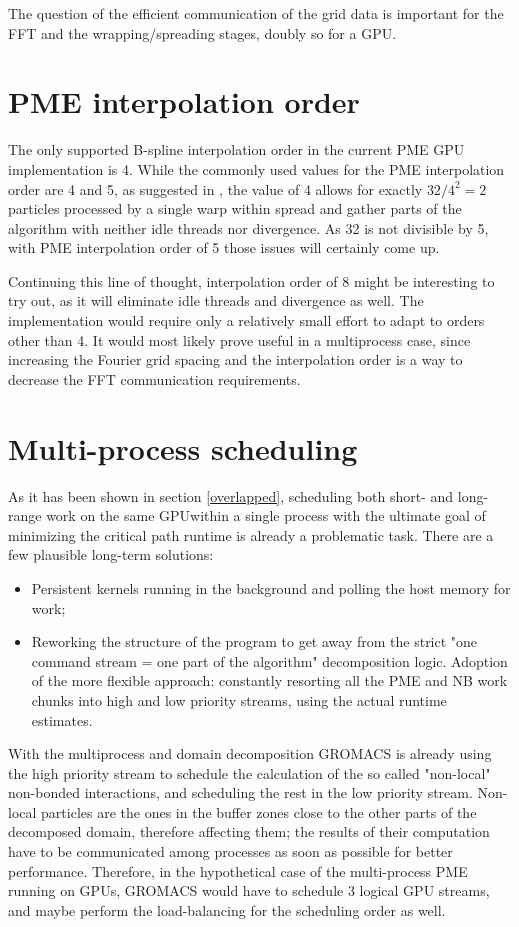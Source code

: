 \documentclass[12pt,a4paper]{report}
\newcommand{\draft}[1]{#1}
\begin{document}
The question of the efficient communication of the grid data is important for the FFT and the wrapping/spreading stages, doubly so for a GPU.
 
\section{PME interpolation order}
The only supported B-spline interpolation order in the current PME GPU implementation is 4. While the commonly used values for the PME interpolation order are 4 and 5, as suggested in \cite{spme}, the value of 4 allows for exactly $32/4^2 = 2$ particles processed by a single warp within spread and gather parts of the algorithm with neither idle threads nor divergence. As 32 is not divisible by 5, with PME interpolation order of 5 those issues will certainly come up.

Continuing this line of thought, interpolation order of 8 might be interesting to try out, as it will eliminate idle threads and divergence as well. The implementation would require only a relatively small effort to adapt to orders other than 4. It would most likely prove useful in a multiprocess case, since increasing the Fourier grid spacing and the interpolation order is a way to decrease the FFT communication requirements.

\section{Multi-process scheduling}

As it has been shown in section \ref{overlapped}, scheduling both short- and long-range work on the same GPU\draft{within a single process} with the ultimate goal of minimizing the critical path runtime is already a problematic task.
There are a few plausible long-term solutions: 
\begin{itemize}
\item Persistent kernels running in the background and polling the host memory for work;
\item Reworking the structure of the program to get away from the strict "one command stream = one part of the algorithm" decomposition logic. Adoption of the more flexible approach: constantly resorting all the PME and NB work chunks into high and low priority streams, using the actual runtime estimates.
\end{itemize}
With the multiprocess and domain decomposition GROMACS is already using the high priority stream to schedule the calculation of the so called "non-local" non-bonded interactions, and scheduling the rest in the low priority stream. Non-local particles are the ones in the buffer zones close to the other parts of the decomposed domain, therefore affecting them; the results of their computation have to be communicated among processes as soon as possible for better performance.
Therefore, in the hypothetical case of the multi-process PME running on GPUs, GROMACS would have to schedule 3 logical GPU streams, and maybe perform the load-balancing for the scheduling order as well.  

\end{document}
